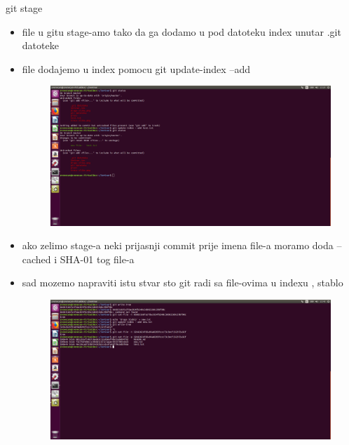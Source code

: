 \documentclass[]{beamer}
\begin{document}
\begin{frame}{git stage}

\begin{itemize}
	\item file u gitu stage-amo tako da ga dodamo u pod datoteku index unutar .git datoteke
	\item file dodajemo u index pomocu git update-index --add
	\begin{figure}
		\centering
	\includegraphics[scale=.01]{./slike/cetvrta_slika.jpg}
	\end{figure}
	\item ako zelimo stage-a neki prijasnji commit prije imena file-a moramo doda --cached i SHA-01 tog file-a
	\item sad mozemo napraviti istu stvar sto git radi sa file-ovima u indexu , stablo
	\begin{figure}
		\centering
	\includegraphics[scale=.01]{./slike/peta_slika.jpg}
	\end{figure}
		
\end{itemize}


\end{frame}
\end{document}
